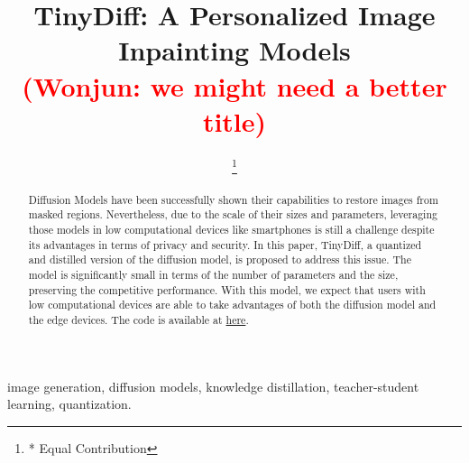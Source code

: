 \documentclass[conference]{IEEEtran}
\newcommand{\WP}[1]{\textcolor{red}{(Wonjun: #1)}}
\begin{document}
\title{TinyDiff: A Personalized Image Inpainting Models \\
{\footnotesize \WP{we might need a better title}}
}

\author{
\thanks{* Equal Contribution}
}

\maketitle

\begin{abstract}
    Diffusion Models have been successfully shown their capabilities to restore images from masked regions.
    Nevertheless, due to the scale of their sizes and parameters,
    leveraging those models in low computational devices like smartphones is still a challenge
    despite its advantages in terms of privacy and security.
    In this paper, TinyDiff, a quantized and distilled version of the diffusion model, is proposed to address this issue.
    The model is significantly small in terms of the number of parameters and the size, preserving the competitive performance.
    With this model, we expect that users with low computational devices are able to take advantages of both the diffusion model and the edge devices.
    The code is available at \href{https://github.com}{here}.
\end{abstract}

\begin{IEEEkeywords}
    image generation, diffusion models, knowledge distillation, teacher-student learning, quantization.
\end{IEEEkeywords}













\printglossary[type=\acronymtype]
\end{document}
